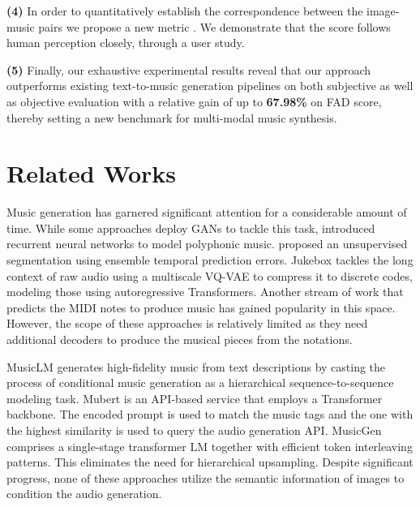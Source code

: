 \textbf{(4)} In order to quantitatively establish the correspondence between the image-music pairs we propose a new metric \imagemusicmetric. We demonstrate that the score follows human perception closely, through a user study.  

\textbf{(5)} Finally, our exhaustive experimental results reveal that our approach outperforms existing text-to-music generation pipelines on both subjective as well as objective evaluation with a relative gain of up to \textbf{67.98\%} on FAD score, thereby setting a new benchmark for multi-modal music synthesis.

\section{Related Works}
\label{sec:related_works}

Music generation has garnered significant attention for a considerable amount of time. While some approaches \cite{yang2017midinet, muhamed2021symbolic, dong2018musegan} deploy GANs to tackle this task, \citet{ycart2017study} introduced recurrent neural networks to model polyphonic music. \citet{bassan} proposed an unsupervised segmentation using ensemble temporal prediction errors. Jukebox \cite{dhariwal2020jukebox} tackles the long context of raw audio using a multiscale VQ-VAE to compress it to discrete codes, modeling those using autoregressive Transformers. Another stream of work \cite{gan2020foley, yang2017midinet} that predicts the MIDI notes to produce music has gained popularity in this space. However, the scope of these approaches is relatively limited as they need additional decoders to produce the musical pieces from the notations. 

MusicLM \cite{musiclm} generates high-fidelity music from text descriptions by casting the process of conditional music generation as a hierarchical sequence-to-sequence modeling task. 
Mubert \cite{mubert} is an API-based service that employs a Transformer backbone. The encoded prompt is used to match the music tags and the one with the highest similarity is used to query the audio generation API. 
MusicGen \cite{musicgen} comprises a single-stage transformer LM together with efficient token interleaving patterns. This eliminates the need for hierarchical upsampling. Despite significant progress, none of these approaches utilize the semantic information of images to condition the audio generation.


